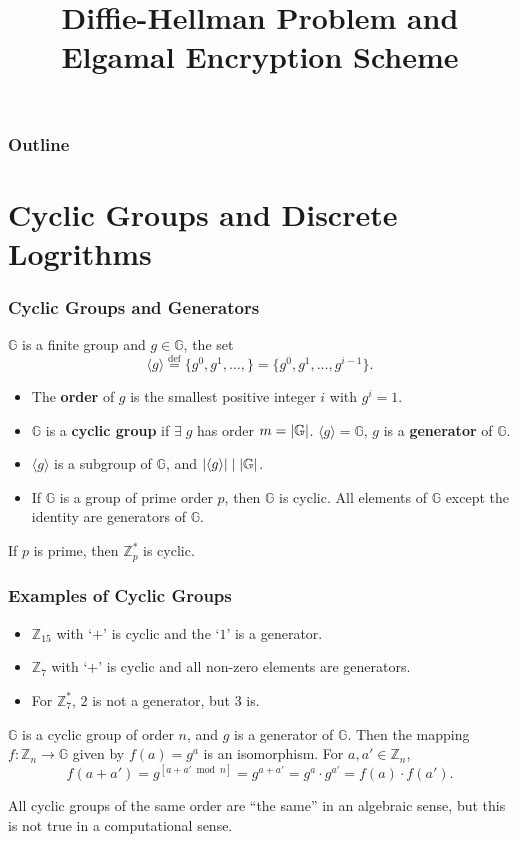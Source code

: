 

\title{Diffie-Hellman Problem and Elgamal Encryption Scheme}


\maketitle
\begin{frame}
\frametitle{Outline}
\tableofcontents
\end{frame}
\section{Cyclic Groups and Discrete Logrithms}
\begin{frame}\frametitle{Cyclic Groups and Generators}
$\mathbb{G}$ is a finite group and $g \in \mathbb{G}$, the set
\[ \langle g \rangle \overset{\text{def}}{=} \{ g^0,g^1,\dotsc,\} = \{ g^0,g^1,\dotsc, g^{i-1}\}. \]
\begin{itemize}
\item The \textbf{order} of $g$ is the smallest positive integer $i$ with $g^i=1$.
\item $\mathbb{G}$ is a \textbf{cyclic group} if $\exists\;g$ has order $m = \lvert\mathbb{G}\rvert$. $\langle g \rangle = \mathbb{G}$, $g$ is a \textbf{generator} of $\mathbb{G}$.
\item $\langle g \rangle$ is a subgroup of $\mathbb{G}$, and $\lvert\langle g \rangle\rvert \mid \lvert\mathbb{G}\rvert$.
\item If $\mathbb{G}$ is a group of prime order $p$, then $\mathbb{G}$ is cyclic. All elements of $\mathbb{G}$ except the identity are generators of $\mathbb{G}$.
\end{itemize}
\begin{theorem}
If $p$ is prime, then $\mathbb{Z}^*_p$ is cyclic.
\end{theorem}
\end{frame}
\begin{frame}\frametitle{Examples of Cyclic Groups}
\begin{exampleblock}{}
\begin{itemize}
\item $\mathbb{Z}_{15}$ with `$+$' is cyclic and the `$1$' is a generator.
\item $\mathbb{Z}_{7}$ with `$+$' is cyclic and all non-zero elements are generators.
\item For $\mathbb{Z}_7^*$, $2$ is not a generator, but $3$ is. 
\end{itemize}
\end{exampleblock}
\begin{exampleblock}{}
$\mathbb{G}$ is a cyclic group of order $n$, and $g$ is a generator of $\mathbb{G}$. Then the mapping $f : \mathbb{Z}_n \to \mathbb{G}$ given by $f(a) = g^a$ is an isomorphism. For $a,a' \in \mathbb{Z}_n$,
\[ f(a+a') = g^{[a+a' \bmod n]} = g^{a+a'} = g^a\cdot g^{a'} = f(a)\cdot f(a').\]
\end{exampleblock}
\begin{alertblock}{}
All cyclic groups of the same order are ``the same'' in an algebraic sense, but this is not true in a computational sense.
\end{alertblock}
\end{frame}
